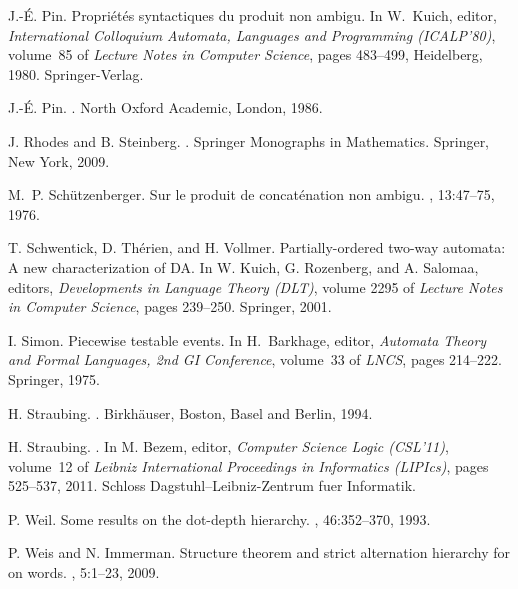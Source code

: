 \documentclass{llncs}
\begin{document}
\begin{thebibliography}{10}
J.-\'E. Pin.
\newblock Propri{\'e}t{\'e}s syntactiques du produit non ambigu.
\newblock In W.~Kuich, editor, {\em International Colloquium Automata,
  Languages and Programming (ICALP'80)}, volume~85 of {\em Lecture Notes in
  Computer Science}, pages 483--499, Heidelberg, 1980. Springer-Verlag.

J.-{\'{E}}. Pin.
.
\newblock North Oxford Academic, London, 1986.

J. Rhodes and B. Steinberg.
.
\newblock Springer Monographs in Mathematics. Springer, New York, 2009.

M.~P. Sch{\"u}tzenberger.
\newblock Sur le produit de concat{\'e}nation non ambigu.
, 13:47--75, 1976.

T. Schwentick, D. Th{\'e}rien, and H. Vollmer.
\newblock Partially-ordered two-way automata: {A} new characterization of {DA}.
\newblock In W. Kuich, G. Rozenberg, and A. Salomaa, editors, {\em
Developments in Language Theory (DLT)},
  volume 2295 of {\em Lecture Notes in Computer Science}, pages 239--250.
  Springer, 2001.

I. Simon.
\newblock Piecewise testable events.
\newblock In H.~Barkhage, editor, {\em Automata Theory and Formal Languages,
  2nd {GI} Conference}, volume~33 of {\em
  LNCS}, pages 214--222. Springer, 1975.

H. Straubing.
.
\newblock Birkh{\"a}user, Boston, Basel and Berlin, 1994.

H. Straubing.
.
\newblock In M. Bezem, editor, {\em Computer Science Logic (CSL'11)}, volume~12 of
  {\em Leibniz International Proceedings in Informatics (LIPIcs)}, pages
  525--537, 2011. Schloss Dagstuhl--Leibniz-Zentrum fuer
  Informatik.

P. Weil.
\newblock Some results on the dot-depth hierarchy.
, 46:352--370, 1993.

P. Weis and N. Immerman.
\newblock Structure theorem and strict alternation hierarchy for
   on words.
, 5:1--23, 2009.

\end{thebibliography}
\end{document}
